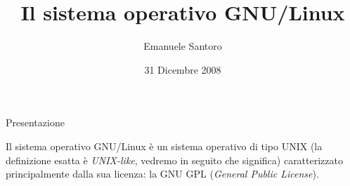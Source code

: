 \documentclass[pdf,slideColor,nocolorBG,accumulate,total,gyom]{prosper}
\author{Emanuele Santoro}
\date{31 Dicembre 2008}
\title{Il sistema operativo GNU/Linux}
\begin{document}
\maketitle

\begin{slide}{Presentazione}

Il sistema operativo GNU/Linux è un sistema operativo di tipo UNIX (la
definizione esatta è \emph{UNIX-like}, vedremo in seguito che significa)
caratterizzato principalmente dalla sua licenza: la GNU GPL
(\emph{General Public License}).

\end{slide}








































\end{document}
